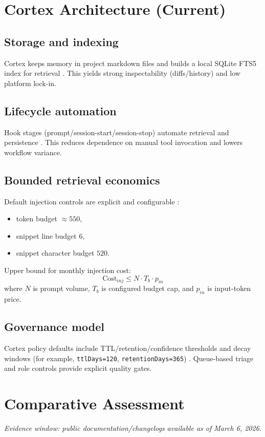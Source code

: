 \documentclass[10pt,twocolumn]{article}
\begin{document}
\section{Cortex Architecture (Current)}
\subsection{Storage and indexing}
Cortex keeps memory in project markdown files and builds a local SQLite FTS5 index for retrieval \cite{cortex-readme,cortex-shared,cortex-cli}. This yields strong inspectability (diffs/history) and low platform lock-in.

\subsection{Lifecycle automation}
Hook stages (prompt/session-start/session-stop) automate retrieval and persistence \cite{cortex-cli,cortex-hooks}. This reduces dependence on manual tool invocation and lowers workflow variance.

\subsection{Bounded retrieval economics}
Default injection controls are explicit and configurable \cite{cortex-cli,cortex-index}:
\begin{itemize}
  \item token budget \(\approx 550\),
  \item snippet line budget \(6\),
  \item snippet character budget \(520\).
\end{itemize}

Upper bound for monthly injection cost:
\[
\mathrm{Cost}_{inj} \le N \cdot T_b \cdot p_{in}
\]
where \(N\) is prompt volume, \(T_b\) is configured budget cap, and \(p_{in}\) is input-token price.

\subsection{Governance model}
Cortex policy defaults include TTL/retention/confidence thresholds and decay windows (for example, \texttt{ttlDays=120}, \texttt{retentionDays=365}) \cite{cortex-shared}. Queue-based triage and role controls provide explicit quality gates.

\section{Comparative Assessment}
\textit{Evidence window: public documentation/changelogs available as of March 6, 2026.}
\end{document}
